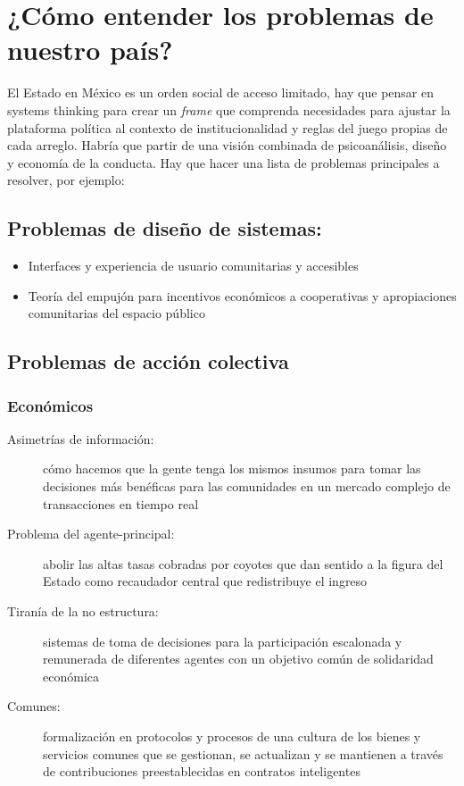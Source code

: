\section{¿Cómo entender los problemas de nuestro país?}
\label{sec:problemaspais}

El Estado en México es un orden social de acceso limitado, hay que
pensar en systems thinking para crear un \emph{frame} que comprenda necesidades
para ajustar la plataforma política al contexto de institucionalidad y
reglas del juego propias de cada arreglo. Habría que partir de una
visión combinada de psicoanálisis, diseño y economía de la conducta. Hay
que hacer una lista de problemas principales a resolver, por ejemplo:

\subsection{Problemas de diseño de sistemas:}
\label{sec:probsis}

\begin{itemize}
	\item Interfaces y experiencia de usuario comunitarias y accesibles

	\item Teoría del empujón para incentivos económicos a cooperativas y apropiaciones comunitarias del espacio público
\end{itemize}

\subsection{Problemas de acción colectiva}
\label{sub:probaccion}

\subsubsection{Económicos}
\label{subs:economicos}

\begin{description}
	\item[Asimetrías de información:] cómo hacemos que la gente tenga los mismos insumos para tomar las decisiones más benéficas para las comunidades en un mercado complejo de transacciones en tiempo real

	\item[Problema del agente-principal:] abolir las altas tasas cobradas por coyotes que dan sentido a la figura del Estado como recaudador central que redistribuye el ingreso

	\item[Tiranía de la no estructura:] sistemas de toma de decisiones para la participación escalonada y remunerada de diferentes agentes con un objetivo común de solidaridad económica

	\item[Comunes:] formalización en protocolos y procesos de una cultura de los bienes y servicios comunes que se gestionan, se actualizan y se mantienen a través de contribuciones preestablecidas en contratos inteligentes
\end{description}

